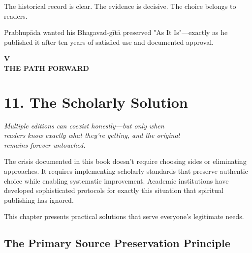 \documentclass[11pt,twoside]{book}
\begin{document}
The historical record is clear. The evidence is decisive. The choice belongs to readers.

Prabhupāda wanted his Bhagavad-gītā preserved "As It Is"—exactly as he published it after ten years of satisfied use and documented approval.

\clearpage
\thispagestyle{empty}
\vspace*{0.25\textheight}
\begin{center}
{\Huge\bfseries\MakeUppercase{\textbf{V}}}\\[0.5cm]
{\huge\bfseries THE PATH FORWARD}
\end{center}
\vspace*{\fill}
\clearpage
\thispagestyle{empty} %
\mbox{}
\newpage
\chapter*{11. The Scholarly Solution}
\label{sec:org1d5846f}

{\centering\itshape Multiple editions can coexist honestly—but only when\\readers know exactly what they're getting, and the original\\remains forever untouched.\par}
\vspace{0.3cm}

\normalfont\justifying
The crisis documented in this book doesn't require choosing sides or eliminating approaches. It requires implementing scholarly standards that preserve authentic choice while enabling systematic improvement. Academic institutions have developed sophisticated protocols for exactly this situation that spiritual publishing has ignored.

This chapter presents practical solutions that serve everyone's legitimate needs.
\section*{The Primary Source Preservation Principle}
\label{sec:org397b468}
\end{document}
